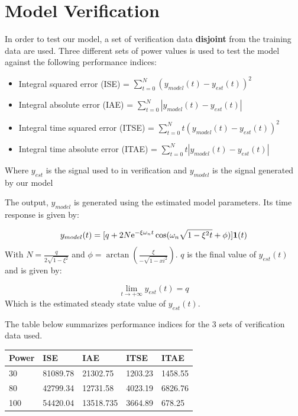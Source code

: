 \clearpage
\section{Model Verification}
\label{sec:modelVerification}

In order to test our model, a set of verification data \textbf{disjoint} from the training data are used. Three different sets of power values is used to test the model against the following performance indices:

\begin{itemize}
	\item Integral squared error (ISE) = $\sum _{t=0}^{N}(y _{model}(t) - y _{est}(t))^2$ 
    \item Integral absolute error (IAE) = $\sum _{t=0}^{N}|y _{model}(t) - y _{est}(t)|$ 
    \item Integral time squared error (ITSE) = $\sum _{t=0}^{N}t(y _{model}(t) - y _{est}(t))^2$ 
    \item Integral time absolute error (ITAE) = $\sum _{t=0}^{N}t|y _{model}(t) - y _{est}(t)|$ 
\end{itemize}
Where $y _{est}$ is the signal used to in verification 
and $y _{model}$ is the signal generated by our model

The output, $y _{model}$ is generated using the estimated model parameters. Its time response is given by:

\begin{equation}
y _{model}(t) = [q + 2N\mathrm{e}^{-\xi \omega _nt}\cos (\omega _n\sqrt{1 - \xi^2t} + \phi)]\textbf{1}(t)
\end{equation}
With $N = \frac{q}{2\sqrt{1-\xi^2}}$ and $\phi = \arctan (\frac{\xi}{-\sqrt{1-xi^2}})$.
\newline
$q$ is the final value of $y _{est}(t)$ and is given by:

\begin{equation}
	\lim _{t\to +\infty}y _{est}(t) = q
\end{equation}
Which is the estimated steady state value of $y _{est}(t)$.

The table below summarizes performance indices for the 3 sets of verification data used.

\begin{tabular}{| l | l | l | l | l |}
\hline
 Power & ISE & IAE & ITSE & ITAE \\
 \hline
30 & 81089.78& 21302.75& 1203.23& 1458.55 \\
\hline
80 & 42799.34&12731.58 &4023.19 & 6826.76 \\
\hline
100 & 54420.04& 13518.735& 3664.89& 678.25  \\
\hline
\end{tabular}

